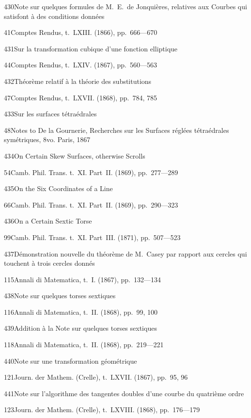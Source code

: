 \documentclass[11pt,a4paper]{book}
\providecommand{\tocentry}[2]{#1\dotfill #2\par}
\begin{document}


\tocentry{430}{Note sur quelques formules de M.~E.~de Jonqui\`{e}res, relatives aux Courbes qui satisfont \`{a} des conditions donn\'{e}es}{41}{Comptes Rendus, t.~LXIII. (1866), pp.~666---670}

\tocentry{431}{Sur la transformation cubique d'une fonction elliptique}{44}{Comptes Rendus, t.~LXIV. (1867), pp.~560---563}

\tocentry{432}{Th\'{e}or\`{e}me relatif \`{a} la th\'{e}orie des substitutions}{47}{Comptes Rendus, t.~LXVII. (1868), pp.~784, 785}

\tocentry{433}{Sur les surfaces t\'{e}tra\'{e}drales}{48}{Notes to De la Gournerie, Recherches sur les Surfaces r\'{e}gl\'{e}es t\'{e}tra\'{e}drales sym\'{e}triques, 8vo. Paris, 1867}

\newpage

\tocentry{434}{On Certain Skew Surfaces, otherwise Scrolls}{54}{Camb. Phil. Trans. t.~XI. Part~II. (1869), pp.~277---289}

\tocentry{435}{On the Six Coordinates of a Line}{66}{Camb. Phil. Trans. t.~XI. Part~II. (1869), pp.~290---323}

\tocentry{436}{On a Certain Sextic Torse}{99}{Camb. Phil. Trans. t.~XI. Part~III. (1871), pp.~507---523}

\tocentry{437}{D\'{e}monstration nouvelle du th\'{e}or\`{e}me de M.~Casey par rapport aux cercles qui touchent \`{a} trois cercles donn\'{e}s}{115}{Annali di Matematica, t.~I. (1867), pp.~132---134}

\tocentry{438}{Note sur quelques torses sextiques}{116}{Annali di Matematica, t.~II. (1868), pp.~99, 100}

\tocentry{439}{Addition \`{a} la Note sur quelques torses sextiques}{118}{Annali di Matematica, t.~II. (1868), pp.~219---221}

\tocentry{440}{Note sur une transformation g\'{e}om\'{e}trique}{121}{Journ. der Mathem. (Crelle), t.~LXVII. (1867), pp.~95, 96}

\tocentry{441}{Note sur l'algorithme des tangentes doubles d'une courbe du quatri\`{e}me ordre}{123}{Journ. der Mathem. (Crelle), t.~LXVIII. (1868), pp.~176---179}
\end{document}
